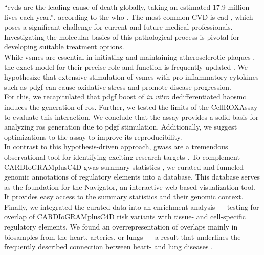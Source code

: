 “\Acp{cvd} are the leading cause of death globally, taking an estimated 17.9 million lives each year.”, according to the \ac{who} \cite{whoCardiovascularDiseases2022}. The most common CVD is \ac{cad} \cite{centersfordiseasecontrolandpreventionHeartDiseaseFacts2022}, which poses a significant challenge for current and future medical professionals. Investigating the molecular basics of this pathological process is pivotal for developing suitable treatment options.\\
While \acp{vsmc} are essential in initiating and maintaining atherosclerotic plaques \cite{doranRoleSmoothMuscle2008}, the exact model for their precise role and function is frequently updated \cite{liuSmoothMuscleCell2019, grootaertVascularSmoothMuscle2021, yapSixShadesVascular2021}. We hypothesize that extensive stimulation of \acp{vsmc} with pro-inflammatory cytokines such as \ac{pdgf} can cause oxidative stress and promote disease progression.\\
For this, we recapitulated that \acs{pdgf} boost of \textit{in vitro} dedifferentiated \ac{haosmc} induces the generation of \ac{ros}. Further, we tested the limits of the CellROX\texttrademark Assay to evaluate this interaction. We conclude that the assay provides a solid basis for analyzing \ac{ros} generation due to \ac{pdgf} stimulation. Additionally, we suggest optimizations to the assay to improve its reproducibility.\\
In contrast to this hypothesis-driven approach, \acp{gwas} are a tremendous observational tool for identifying exciting research targets \cite{uffelmannGenomewideAssociationStudies2021}. To complement CARDIoGRAMplusC4D \ac{gwas} summary statistics \cite{aragamDiscoverySystematicCharacterization2021}, we curated and funneled genomic annotations of regulatory elements into a database. This database serves as the foundation for the  Navigator, an interactive web-based visualization tool. It provides easy access to the  summary statistics and their genomic context.\\
Finally, we integrated the curated data into an enrichment analysis — testing for overlap of CARDIoGRAMplusC4D risk variants with tissue- and cell-specific regulatory elements. We found an overrepresentation of overlaps mainly in biosamples from the heart, arteries, or lungs — a result that underlines the frequently described connection between heart- and lung diseases \cite{carterAssociationCardiovascularDisease2019, nowakLungFunctionCoronary2018, hanPulmonaryDiseasesHeart2007}.
